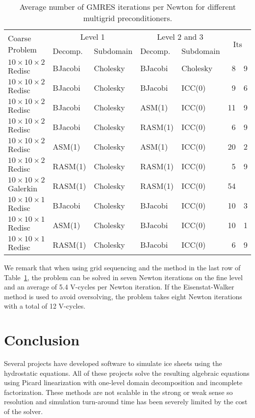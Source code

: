 \documentclass[final]{siamltex}
\newcommand{\citep}[1]{{\cite{#1}}}
\begin{document}
\begin{table}
  \centering\caption{Average number of GMRES iterations per Newton for different multigrid preconditioners.}\label{tab:xmg}
  \begin{tabular}{l|ll|ll|r@{.}l}
    \multirow{2}{*}{Coarse Problem} & \multicolumn{2}{c|}{Level 1} & \multicolumn{2}{c|}{Level 2 and 3} & \multicolumn{2}{c}{\multirow{2}{*}{Its}} \\
                                   & Decomp. & Subdomain & Decomp. & Subdomain         \\ \hline
    $10\times 10\times 2$ Redisc   & BJacobi & Cholesky & BJacobi & Cholesky & 8  & 9 \\
    $10\times 10\times 2$ Redisc   & BJacobi & Cholesky & BJacobi & ICC(0)   & 9  & 6 \\
    $10\times 10\times 2$ Redisc   & BJacobi & Cholesky & ASM(1)  & ICC(0)   & 11 & 9 \\
    $10\times 10\times 2$ Redisc   & BJacobi & Cholesky & RASM(1) & ICC(0)   & 6  & 9 \\
    $10\times 10\times 2$ Redisc   & ASM(1)  & Cholesky & ASM(1)  & ICC(0)   & 20 & 2 \\
    $10\times 10\times 2$ Redisc   & RASM(1) & Cholesky & RASM(1) & ICC(0)   & 5  & 9 \\
    $10\times 10\times 2$ Galerkin & RASM(1) & Cholesky & RASM(1) & ICC(0)   & 54 &   \\
    $10\times 10\times 1$ Redisc   & BJacobi & Cholesky & BJacobi & ICC(0)   & 10 & 3 \\
    $10\times 10\times 1$ Redisc   & ASM(1)  & Cholesky & BJacobi & ICC(0)   & 10 & 1 \\
    $10\times 10\times 1$ Redisc   & RASM(1) & Cholesky & BJacobi & ICC(0)   & 6  & 9 \\
  \end{tabular}
\end{table}

We remark that when using grid sequencing and the method in the last row of Table~\ref{tab:xmg}, the problem can be solved in seven Newton iterations on the fine level and an average of 5.4 V-cycles per Newton iteration.
If the Eisenstat-Walker method is used to avoid oversolving, the problem takes eight Newton iterations with a total of 12 V-cycles.

\section{Conclusion}
Several projects \citep{seacism,issm,johnson2007modeling,desmedt2010using,pattyn2003ntd} have developed software to simulate ice sheets using the hydrostatic equations.
All of these projects solve the resulting algebraic equations using Picard linearization with one-level domain decomposition and incomplete factorization.
These methods are not scalable in the strong or weak sense so resolution and simulation turn-around time has been severely limited by the cost of the solver.
\end{document}
